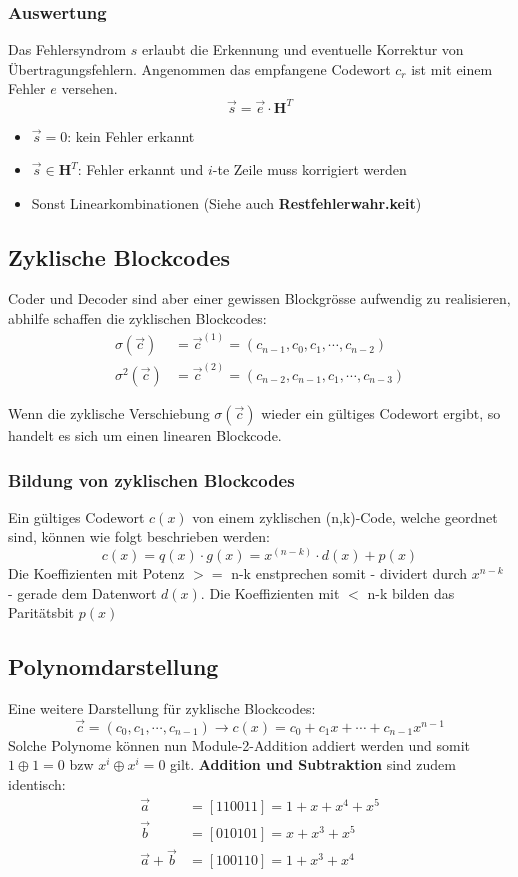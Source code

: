 \subsubsection{Auswertung}
Das Fehlersyndrom $s$ erlaubt die Erkennung und eventuelle Korrektur von Übertragungsfehlern. Angenommen das empfangene Codewort $c_r$ ist mit einem Fehler $e$ versehen.
\[
\vec{s} = \vec{e} \cdot \mathbf{H}^T
\]
\begin{itemize}[nosep]
	\item $\vec{s} = 0$: kein Fehler erkannt
	\item $\vec{s} \in \mathbf{H}^T$: Fehler erkannt und $i$-te Zeile muss korrigiert werden
	\item Sonst Linearkombinationen (Siehe auch  \textbf{Restfehlerwahr.keit})
\end{itemize}


\subsection{Zyklische Blockcodes}
 Coder und Decoder sind aber einer gewissen Blockgrösse aufwendig zu realisieren, abhilfe schaffen die zyklischen Blockcodes:
\begin{align*}
	\sigma(\vec{c}) &= \vec{c}^{(1)} = \left(c_{n-1}, c_0, c_1, \cdots, c_{n-2}\right) \\	
	\sigma^2(\vec{c}) &= \vec{c}^{(2)} = \left(c_{n-2}, c_{n-1}, c_1, \cdots, c_{n-3}\right)
\end{align*}

Wenn die zyklische Verschiebung $\sigma(\vec{c})$ wieder ein gültiges Codewort ergibt, so handelt es sich um einen linearen Blockcode.

\subsubsection{Bildung von zyklischen Blockcodes}
Ein gültiges Codewort $c(x)$ von einem zyklischen (n,k)-Code, welche geordnet sind, können wie folgt beschrieben werden:
\[
c(x) = q(x)\cdot g(x) = x^{(n-k)}\cdot d(x) + p(x)
\]
Die Koeffizienten mit Potenz $>=$ n-k enstprechen somit - dividert durch $x^{n-k}$ - gerade dem Datenwort $d(x)$. Die Koeffizienten mit $<$ n-k bilden das Paritätsbit $p(x)$

\subsection{Polynomdarstellung}
Eine weitere Darstellung für zyklische Blockcodes:
\[
\vec{c} = \left(c_0, c_1, \cdots, c_{n-1}\right) \xrightarrow{} c(x) = c_0 + c_1x + \cdots + c_{n-1}x^{n-1}
\]
Solche Polynome können nun Module-2-Addition addiert werden und somit $1 \oplus 1 = 0$ bzw $x^i \oplus x^i = 0$ gilt. \textbf{Addition und Subtraktion} sind zudem identisch:
\begin{align*}
	\vec{a} &= [110011] = 1 + x + x^4 +x^5 \\
	\vec{b} &= [010101] = x + x^3 + x^5 \\
	\vec{a} + \vec{b} &= [100110] = 1 + x^3 + x^4
\end{align*}


